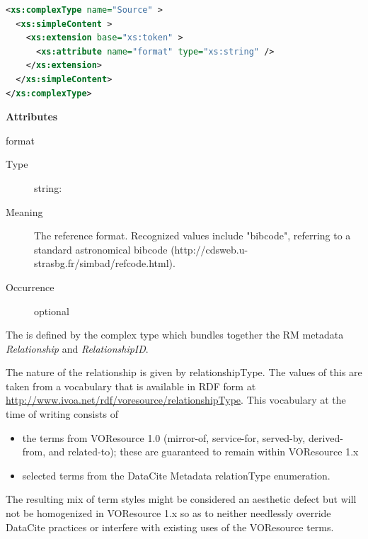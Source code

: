 \documentclass[11pt,a4paper]{ivoa}
\begin{document}
\begin{lstlisting}[language=XML,basicstyle=\footnotesize]
<xs:complexType name="Source" >
  <xs:simpleContent >
    <xs:extension base="xs:token" >
      <xs:attribute name="format" type="xs:string" />
    </xs:extension>
  </xs:simpleContent>
</xs:complexType>
\end{lstlisting}

\vspace{0.5ex}\noindent\textbf{ Attributes}

\begingroup\small\begin{bigdescription}
\item[format]
\begin{description}
\item[Type] string: 
\item[Meaning] 
                 The reference format.  Recognized values include {"}bibcode{"}, 
                 referring to a standard astronomical bibcode 
                 (http://cdsweb.u-strasbg.fr/simbad/refcode.html).  
               
\item[Occurrence] optional
\end{description}


\end{bigdescription}\endgroup

\endgroup


The  is defined by the
 complex type which bundles together the
RM metadata \emph{Relationship} and
\emph{RelationshipID}.  

The nature of the relationship is given by relationshipType.  The values
of this are taken from a vocabulary that is available in RDF form at
\url{http://www.ivoa.net/rdf/voresource/relationshipType}.  This
vocabulary at the time of writing consists of 

\begin{itemize}
\item the terms from VOResource 1.0 (mirror-of, service-for, served-by,
derived-from, and related-to); these are guaranteed to remain within
VOResource 1.x
\item selected terms from the DataCite Metadata relationType enumeration.
\end{itemize}

The resulting mix of term styles might be considered an aesthetic defect
but will not be homogenized in VOResource 1.x so as to neither
needlessly override DataCite practices or interfere with existing uses
of the VOResource terms.
\end{document}
